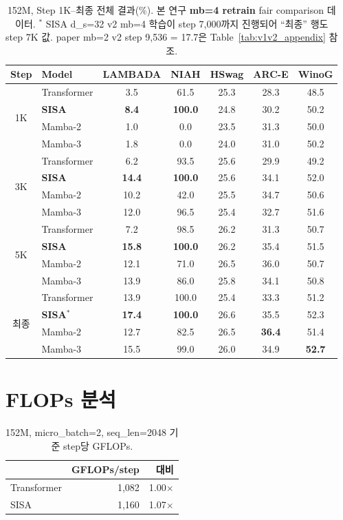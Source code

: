 \documentclass[11pt]{article}
\begin{document}
\begin{table}[h]
\centering\small
\caption{152M, Step 1K--최종 전체 결과(\%). 본 연구 \textbf{mb=4 retrain} fair comparison 데이터. $^*$ SISA d_s=32 v2 mb=4 학습이 step 7,000까지 진행되어 ``최종'' 행도 step 7K 값. paper mb=2 v2 step 9,536 = 17.7은 Table~\ref{tab:v1v2_appendix} 참조.}
\begin{tabular}{clccccc}
\toprule
\textbf{Step} & \textbf{Model} & \textbf{LAMBADA} & \textbf{NIAH} & \textbf{HSwag} & \textbf{ARC-E} & \textbf{WinoG} \\
\midrule
\multirow{4}{*}{1K}
& Transformer & 3.5 & 61.5 & 25.3 & 28.3 & 48.5 \\
& \textbf{SISA} & \textbf{8.4} & \textbf{100.0} & 24.8 & 30.2 & 50.2 \\
& Mamba-2 & 1.0 & 0.0 & 23.5 & 31.3 & 50.0 \\
& Mamba-3 & 1.8 & 0.0 & 24.0 & 31.0 & 50.2 \\
\midrule
\multirow{4}{*}{3K}
& Transformer & 6.2 & 93.5 & 25.6 & 29.9 & 49.2 \\
& \textbf{SISA} & \textbf{14.4} & \textbf{100.0} & 25.6 & 34.1 & 52.0 \\
& Mamba-2 & 10.2 & 42.0 & 25.5 & 34.7 & 50.6 \\
& Mamba-3 & 12.0 & 96.5 & 25.4 & 32.7 & 51.6 \\
\midrule
\multirow{4}{*}{5K}
& Transformer & 7.2 & 98.5 & 26.2 & 31.3 & 50.7 \\
& \textbf{SISA} & \textbf{15.8} & \textbf{100.0} & 26.2 & 35.4 & 51.5 \\
& Mamba-2 & 12.1 & 71.0 & 26.5 & 36.0 & 50.7 \\
& Mamba-3 & 13.9 & 86.0 & 25.8 & 34.1 & 50.8 \\
\midrule
\multirow{4}{*}{최종}
& Transformer & 13.9 & 100.0 & 25.4 & 33.3 & 51.2 \\
& \textbf{SISA}$^*$ & \textbf{17.4} & \textbf{100.0} & 26.6 & 35.5 & 52.3 \\
& Mamba-2 & 12.7 & 82.5 & 26.5 & \textbf{36.4} & 51.4 \\
& Mamba-3 & 15.5 & 99.0 & 26.0 & 34.9 & \textbf{52.7} \\
\bottomrule
\end{tabular}
\end{table}

\section{FLOPs 분석}

\begin{table}[h]
\centering\small
\caption{152M, micro\_batch=2, seq\_len=2048 기준 step당 GFLOPs.}
\begin{tabular}{lrr}
\toprule
& \textbf{GFLOPs/step} & \textbf{대비} \\
\midrule
Transformer & 1,082 & 1.00$\times$ \\
SISA & 1,160 & 1.07$\times$ \\
\bottomrule
\end{tabular}
\end{table}
\end{document}
